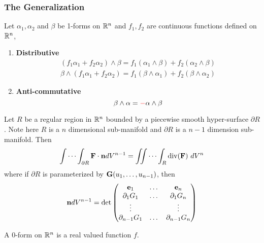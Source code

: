 \documentclass[11pt]{article}
\begin{document}
		\subsubsection{The Generalization}
			\begin{proposition} Let $\alpha_1, \alpha_2$ and $\beta$ be 1-forms on $\mathbb{R}^n$ and $f_1, f_2$ are continuous functions defined on $\mathbb{R}^n$,
				\begin{enumerate}
					\item \textbf{Distributive}
					\begin{gather}
						(f_1 \alpha_1 + f_2 \alpha_2) \land \beta = f_1(\alpha_1 \land \beta) + f_2 (\alpha_2 \land \beta) \\
						\beta \land (f_1 \alpha_1 + f_2 \alpha_2) = f_1 (\beta \land \alpha_1) + f_2 (\beta \land \alpha_2)
					\end{gather}
					\item \textbf{Anti-commutative}
					\begin{equation}
						\beta \land \alpha = \textcolor{red}{-} \alpha \land \beta
					\end{equation}
				\end{enumerate}
			\end{proposition}
			
			\begin{theorem}
				Let $R$ be a regular region in $\mathbb{R}^n$ bounded by a piecewise smooth hyper-surface $\partial R$. Note here $R$ is a $n$ dimensional sub-manifold and $\partial R$ is a $n-1$ dimension sub-manifold. Then
				\begin{gather}
					\idotsint_{\partial R} \textbf{F} \cdot \textbf{n} dV^{n-1} = \iint \cdots \int_R \text{div}(\textbf{F})\ dV^n
				\end{gather}
				where if $\partial R$ is parameterized by $\textbf{G}(u_1, \dots, u_{n-1})$, then
				\begin{gather}
					\textbf{n}dV^{n-1} = \det \begin{pmatrix}
						\textbf{e}_1 & \dots & \textbf{e}_n \\
						\partial_1 G_1 & \dots & \partial_1 G_n \\
						\vdots & & \vdots \\
						\partial_{n-1} G_1 & \dots & \partial_{n-1} G_n
					\end{pmatrix}
				\end{gather}
			\end{theorem}
			
			\begin{definition}
				A 0-form on $\mathbb{R}^n$ is a real valued function $f$.
			\end{definition}
			
\end{document}
